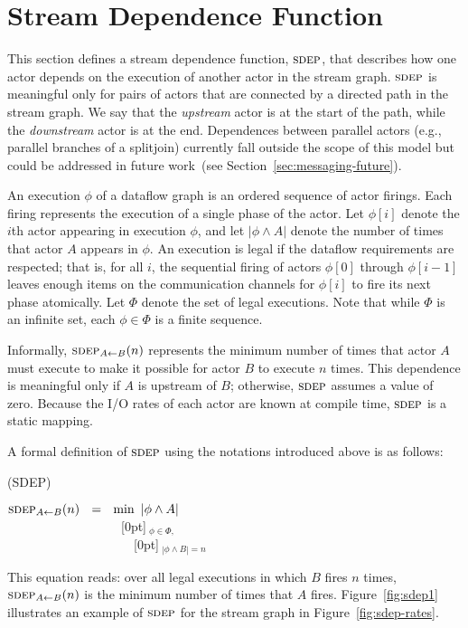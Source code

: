 \section{Stream Dependence Function}
\label{sec:sdep}

This section defines a stream dependence function, $\textsc{sdep}$, that
describes how one actor depends on the execution of another actor in
the stream graph.  $\textsc{sdep}$ is meaningful only for pairs of actors that
are connected by a directed path in the stream graph.  We say that the
{\it upstream} actor is at the start of the path, while the {\it
downstream} actor is at the end.  Dependences between parallel actors
(e.g., parallel branches of a splitjoin) currently fall outside the
scope of this model but could be addressed in future work~(see
Section~\ref{sec:messaging-future}).

An execution $\phi$ of a dataflow graph is an ordered sequence of
actor firings.  Each firing represents the execution of a single phase
of the actor.  Let $\phi[i]$ denote the $i$th actor appearing in
execution $\phi$, and let $|\phi \wedge A|$ denote the number of times
that actor $A$ appears in $\phi$.  An execution is legal if the
dataflow requirements are respected; that is, for all $i$, the
sequential firing of actors $\phi[0]$ through $\phi[i-1]$ leaves
enough items on the communication channels for $\phi[i]$ to fire its
next phase atomically.  Let $\Phi$ denote the set of legal executions.
Note that while $\Phi$ is an infinite set, each $\phi \in \Phi$ is a
finite sequence.

Informally, $\textsc{sdep}_{A \small{\leftarrow} B}(n)$ represents the minimum number of times
that actor $A$ must execute to make it possible for actor $B$ to
execute $n$ times.  This dependence is meaningful only if $A$ is
upstream of $B$; otherwise, $\textsc{sdep}$ assumes a value of zero.  Because
the I/O rates of each actor are known at compile time, $\textsc{sdep}$ is a
static mapping.

A formal definition of $\textsc{sdep}$ using the notations introduced above is
as follows:
\begin{definition}(SDEP)
\begin{center}
$\textsc{sdep}_{A \small{\leftarrow} B}(n)~~ = ~~\min~|\phi \wedge A|$ \\
~~~~~~~~~~~~~~~~~{\tiny ~}\raisebox{5pt}[0pt]{$~_{\phi \in \Phi,}$} \\
~~~~~~~~~~~~~~~~~~~{\tiny ~}\hspace{-1.3pt}\raisebox{8pt}[0pt]{$~_{|\phi \wedge B| = n}$}
\label{eq:sdepdef}
\end{center}
\vspace{-12pt}
\end{definition}
This equation reads: over all legal executions in which $B$ fires $n$
times, $\textsc{sdep}_{A \small{\leftarrow} B}(n)$ is the minimum number of times that $A$
fires.  Figure~\ref{fig:sdep1} illustrates an example of $\textsc{sdep}$ for
the stream graph in Figure~\ref{fig:sdep-rates}.

